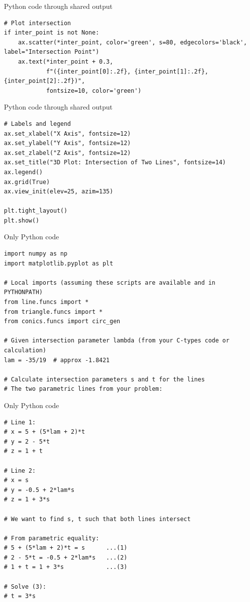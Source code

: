 \documentclass{beamer}
\begin{document}
  \begin{frame}[fragile]{Python code through shared output}
\begin{lstlisting}
# Plot intersection
if inter_point is not None:
    ax.scatter(*inter_point, color='green', s=80, edgecolors='black', label="Intersection Point")
    ax.text(*inter_point + 0.3, 
            f"({inter_point[0]:.2f}, {inter_point[1]:.2f}, {inter_point[2]:.2f})",
            fontsize=10, color='green')
\end{lstlisting}
\end{frame}
  \begin{frame}[fragile]{Python code through shared output}
\begin{lstlisting}
# Labels and legend
ax.set_xlabel("X Axis", fontsize=12)
ax.set_ylabel("Y Axis", fontsize=12)
ax.set_zlabel("Z Axis", fontsize=12)
ax.set_title("3D Plot: Intersection of Two Lines", fontsize=14)
ax.legend()
ax.grid(True)
ax.view_init(elev=25, azim=135)

plt.tight_layout()
plt.show()

 \end{lstlisting}
\end{frame}
  \begin{frame}[fragile]{Only Python code}
\begin{lstlisting}
import numpy as np
import matplotlib.pyplot as plt

# Local imports (assuming these scripts are available and in PYTHONPATH)
from line.funcs import *
from triangle.funcs import *
from conics.funcs import circ_gen

# Given intersection parameter lambda (from your C-types code or calculation)
lam = -35/19  # approx -1.8421

# Calculate intersection parameters s and t for the lines
# The two parametric lines from your problem:
 \end{lstlisting}
\end{frame}
  \begin{frame}[fragile]{Only Python code}
\begin{lstlisting}
# Line 1:
# x = 5 + (5*lam + 2)*t
# y = 2 - 5*t
# z = 1 + t

# Line 2:
# x = s
# y = -0.5 + 2*lam*s
# z = 1 + 3*s

# We want to find s, t such that both lines intersect

# From parametric equality:
# 5 + (5*lam + 2)*t = s      ...(1)
# 2 - 5*t = -0.5 + 2*lam*s   ...(2)
# 1 + t = 1 + 3*s            ...(3)

# Solve (3):
# t = 3*s
 \end{lstlisting}
\end{frame}
\end{document}
